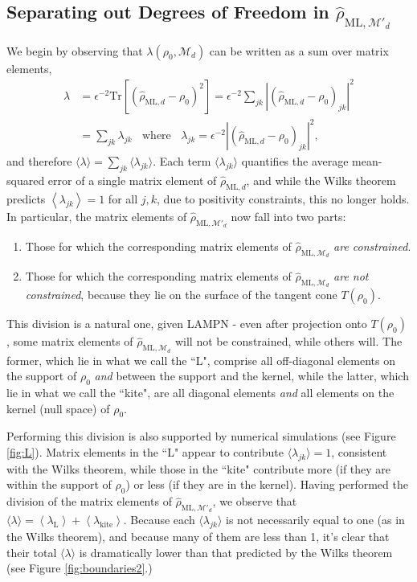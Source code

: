 \documentclass[aps,pra, twocolumn]{revtex4-1}
\newcommand{\M}{\mathcal{M}}
\newcommand{\expect}[1]{\ensuremath{\left\langle#1\right\rangle}}
\newcommand{\rhohat}{\hat{\rho}}
\newcommand{\rhoML}[1]{\rhohat_{\scriptscriptstyle{\mathrm{ML},#1}}}
\begin{document}
\subsection{Separating out Degrees of Freedom in $\rhoML{\M'_{d}}$}

We begin by observing that $\lambda(\rho_{0}, \M_{d})$ can be written as a sum over matrix elements,
\begin{align}
\label{eq:llrserrors}
\nonumber \lambda &=\epsilon^{-2}\mathrm{Tr}[(\rhoML{d} - \rho_{0})^{2}] = \epsilon^{-2}\sum_{jk}|(\rhoML{d}- \rho_{0} )_{jk}|^{2}\\
&= \sum_{jk}\lambda_{jk}~~~~\text{where}~~~~\lambda_{jk} = \epsilon^{-2}|(\rhoML{d} - \rho_{0} )_{jk} |^{2},
\end{align}
and therefore $\langle \lambda \rangle = \sum_{jk}\langle\lambda_{jk}\rangle$.  Each term $\langle \lambda_{jk}\rangle$ quantifies the average mean-squared error of a single matrix element of $\rhoML{d}$, and while the Wilks theorem predicts $\expect{\lambda_{jk}}=1$ for all $j,k$, due to positivity constraints, this no longer holds. In particular, the matrix elements of $\rhoML{\M'_{d}}$ now fall into two parts:

\begin{enumerate}[noitemsep]
\item Those for which the corresponding matrix elements of $\rhoML{\M_{d}}$ \emph{are constrained}.
\item Those for which the corresponding matrix elements of $\rhoML{\M_{d}}$ \emph{are not constrained}, because they lie on the surface of the tangent cone $T(\rho_{0})$.
\end{enumerate}
This division is a natural one, given LAMPN - even after projection onto $T(\rho_{0})$ , some matrix elements of $\rhoML{\M_{d}}$ will not be constrained, while others will. The former, which lie in what we call the ``L", comprise all off-diagonal elements on the support of $\rho_0$ \emph{and} between the support and the kernel, while the latter, which lie in what we call the ``kite", are all diagonal elements \emph{and} all elements on the kernel (null space) of $\rho_0$.

Performing this division is also supported by numerical simulations (see Figure \ref{fig:L}). Matrix elements in the ``L" appear to contribute $\langle \lambda_{jk}\rangle = 1$, consistent with the Wilks theorem, while those in the ``kite" contribute more (if they are within the support of $\rho_{0}$) or less (if they are in the kernel).  Having performed the division of the matrix elements of $\rhoML{\M'_{d}}$, we observe that $\langle\lambda\rangle = \expect{\lambda_{\mathrm{L}}} + \expect{\lambda_{\mathrm{kite}}}$. Because each $\langle \lambda_{jk}\rangle$ is not necessarily equal to one (as in the Wilks theorem), and because many of them are less than 1, it's clear that their total $\langle \lambda \rangle$ is dramatically lower than that predicted by the Wilks theorem (see Figure \ref{fig:boundaries2}.)
\end{document}
